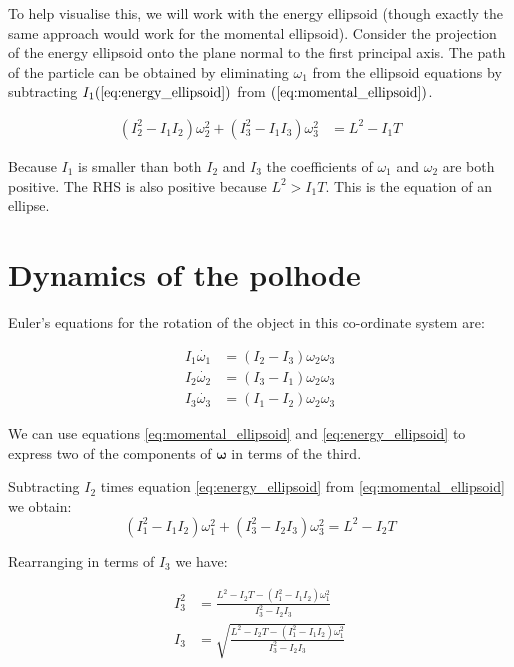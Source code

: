 \documentclass[a4paper, 12pt]{article}
\begin{document}
To help visualise this, we will work with the energy ellipsoid (though exactly the same approach would work for the momental ellipsoid). Consider the projection of the energy ellipsoid onto the plane normal to the first principal axis. The path of the particle can be obtained by eliminating $\omega_1$ from the ellipsoid equations by subtracting $I_1(\ref{eq:energy_ellipsoid})$ from $(\ref{eq:momental_ellipsoid})$.

\begin{align}
  (I_2^2 - I_1I_2)\omega_2^2 + (I_3^2-I_1I_3)\omega_3^2 & = L^2 - I_1T
\end{align}

Because $I_1$ is smaller than both $I_2$ and $I_3$ the coefficients of $\omega_1$ and $\omega_2$ are both positive. The RHS is also positive because $L^2 > I_1T$. This is the equation of an ellipse.


\section{Dynamics of the polhode}

Euler's equations for the rotation of the object in this co-ordinate system are:

\begin{align}
  I_1\dot{\omega_1}& =(I_2 - I_3)\omega_2\omega_3 \label{eq:euler1} \\
  I_2\dot{\omega_2}& =(I_3 - I_1)\omega_2\omega_3 \\
  I_3\dot{\omega_3}& =(I_1 - I_2)\omega_2\omega_3 
\end{align}

We can use equations \ref{eq:momental_ellipsoid} and \ref{eq:energy_ellipsoid} to express two of the components of $\boldsymbol{\omega}$ in terms of the third.

Subtracting $I_2$ times equation \ref{eq:energy_ellipsoid} from \ref{eq:momental_ellipsoid} we obtain:
\begin{equation}
  (I_1^2 - I_1I_2)\omega_1^2 + (I_3^2 - I_2I_3)\omega_3^2 = L^2 - I_2T
\end{equation}

Rearranging in terms of $I_3$ we have:

\begin{align}
  I_3^2 &=\frac{L^2 - I_2T - (I_1^2 - I_1I_2)\omega_1^2}{I_3^2 - I_2I_3} \\
  I_3 &=\sqrt{\frac{L^2 - I_2T - (I_1^2 - I_1I_2)\omega_1^2}{I_3^2 - I_2I_3}}
\end{align}
\end{document}

